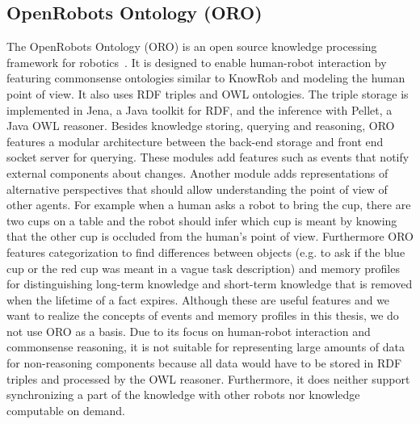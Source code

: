\documentclass[a4paper,11pt]{article}
\begin{document}
\subsection{OpenRobots Ontology (ORO)}
\label{sec:oro}
The OpenRobots Ontology (ORO) is an open source knowledge processing
framework for robotics~\cite{Oro}. It is designed to enable human-robot
interaction by featuring commonsense ontologies similar to KnowRob and
modeling the human point of view. It also uses RDF triples and OWL ontologies.
The triple storage is implemented in Jena, a Java toolkit for RDF, and the
inference with Pellet, a Java OWL reasoner. Besides knowledge storing,
querying and reasoning, ORO features a modular architecture between
the back-end storage and front end socket server for querying. These
modules add features such as events that notify external components
about changes.
Another module adds representations of alternative perspectives that
should allow understanding the point of view of other agents.
For example when a human asks a robot to bring the
cup, there are two cups on a table and the robot should infer which
cup is meant by knowing that the other cup is occluded from the human's
point of view. Furthermore ORO features categorization to find
differences between objects (e.g. to ask if the blue cup or the red
cup was meant in a vague task description) and memory profiles for
distinguishing long-term knowledge and short-term knowledge that is
removed when the lifetime of a fact expires. Although these are useful
features and we want to realize the concepts of events and memory
profiles in this thesis, we do not use ORO as a basis. Due to its
focus on human-robot interaction and commonsense reasoning, it is not
suitable for representing large amounts of data for non-reasoning
components because all data would have to be stored in RDF triples and
processed by the OWL reasoner. Furthermore, it does neither support
synchronizing a part of the knowledge with other robots nor knowledge
computable on demand.
\end{document}
